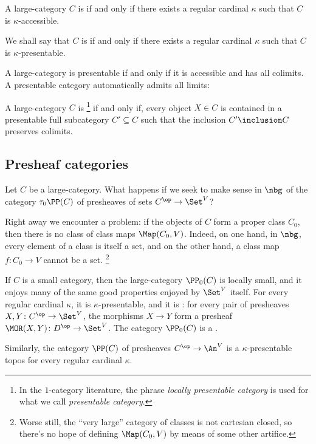 \begin{definition}
	A large-category $ C $ is  if and only if
	there exists a regular cardinal $ \kappa $ such that
	$ C $ is $ \kappa $-accessible.

	We shall say that $ C $ is  if and only if
	there exists a regular cardinal $ \kappa $ such that
	$ C $ is $ \kappa $-presentable.
\end{definition}

\begin{nul}
	A large-category is presentable if and only if
	it is accessible and has all colimits.
	A presentable category automatically admits all limits:
\end{nul}

\begin{definition}
	A large-category $ C $ is %
	\footnote{In the $1$-category literature,
		the phrase \emph{locally presentable category} is used for
		what we call \emph{presentable category}.}
	if and only if, every object $ X \in C $
	is contained in a presentable full subcategory $ C' \subseteq C $
	such that the inclusion $ C' \inclusion C $ preserves colimits.
\end{definition}

\subsection{Presheaf categories}%
\label{sub:presheaf_categories}

Let $ C $ be a large-category.
What happens if we seek to make sense in $ \nbg $
of the category $ \tau_0\PP(C) $ of presheaves of sets
$ C^{\op} \to \Set^V $?

Right away we encounter a problem:
if the objects of $ C $ form a proper class $ C_ 0 $,
then there is no class of class maps $ \Map(C_0, V) $.
Indeed, on one hand, in $ \nbg $, every element of a class is itself a set,
and on the other hand, a class map $ f \colon C_0 \to V $ cannot be a set.%
\footnote{Worse still, the \enquote{very large}
	category of classes is not cartesian closed,
	so there's no hope of defining
	$ \Map(C_0, V) $ by means of some other artifice.}

\begin{nul}
	If $ C $ is a small category, then 
	the large-category $ \PP_0(C) $ is locally small,
	and it enjoys many of the same good properties
	enjoyed by $ \Set^V $ itself.
	For every regular cardinal $ \kappa $,
	it is $ \kappa $-presentable,
	and it is :
	for every pair of presheaves $ X, Y \colon C^{\op} \to \Set^V $,
	the morphisms $ X \to Y $
	form a presheaf $ \MOR(X, Y) \colon D^{\op} \to \Set^V $.
	The category $ \PP_0(C) $ is a .

	Similarly, the category $ \PP(C) $ of presheaves
	$ C^{\op} \to \An^V $
	is a $ \kappa $-presentable topos
	for every regular cardinal $ \kappa $.
\end{nul}

